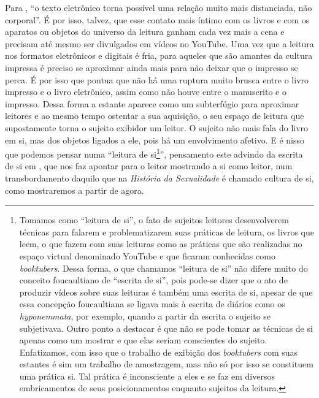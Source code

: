 Para \textcite[p. 16]{chartier1998aventura}, “o texto eletrônico torna possível uma relação muito mais distanciada, não corporal”. É por isso, talvez, que esse contato mais íntimo com os livros e com os aparatos ou objetos do universo da leitura ganham cada vez mais a cena e precisam até mesmo ser divulgados em vídeos no YouTube. Uma vez que a leitura nos formatos eletrônicos e digitais é fria, para aqueles que são amantes da cultura impressa é preciso se aproximar ainda mais para não deixar que o impresso se perca. É por isso que \textcite{chartier1998aventura} pontua que não há uma ruptura muito brusca entre o livro impresso e o livro eletrônico, assim como não houve entre o manuscrito e o impresso. Dessa forma a estante aparece como um subterfúgio para aproximar leitores e ao mesmo tempo ostentar a sua aquisição, o seu espaço de leitura que supostamente torna o sujeito exibidor um leitor. O sujeito não mais fala do livro em si, mas dos objetos ligados a ele, pois há um envolvimento afetivo. E é nisso que podemos pensar numa “leitura de si\footnote{Tomamos como “leitura de si”, o fato de sujeitos leitores desenvolverem técnicas para falarem e problematizarem suas práticas de leitura, os livros que leem, o que fazem com suas leituras como as práticas que são realizadas no espaço virtual denominado YouTube e que ficaram conhecidas como \textit{booktubers}. Dessa forma, o que chamamos “leitura de si” não difere muito do conceito foucaultiano de “escrita de si”, pois pode-se dizer que o ato de produzir vídeos sobre suas leituras é também uma escrita de si, apesar de que essa concepção foucaultiana se ligava mais à escrita de diários como os \textit{hyponemmata}, por exemplo, quando a partir da escrita o sujeito se subjetivava. Outro ponto a destacar é que não se pode tomar as técnicas de si apenas como um mostrar e que elas seriam conscientes do sujeito. Enfatizamos, com isso que o trabalho de exibição dos \textit{booktubers} com suas estantes é sim um trabalho de amostragem, mas não só por isso se constituem uma prática si. Tal prática é inconsciente a eles e se faz em diversos embricamentos de seus posicionamentos enquanto sujeitos da leitura.}”, pensamento este advindo da escrita de si em \textcite{foucault2006escrita}, que nos faz apontar para o leitor mostrando a si como leitor, num transbordamento daquilo que na \textit{História da Sexualidade} é chamado cultura de si, como mostraremos a partir de agora.


